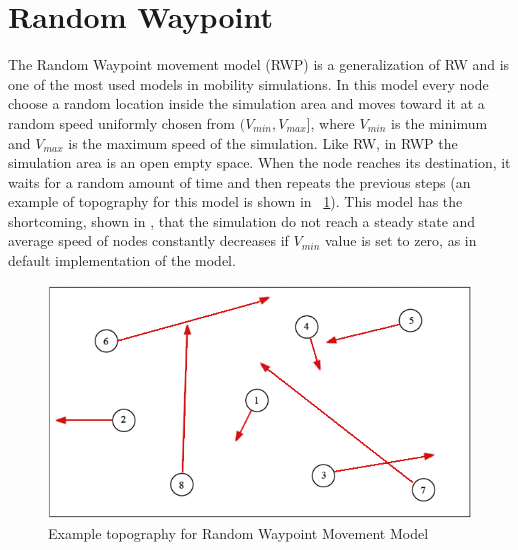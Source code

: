 \section{Random Waypoint}
The Random Waypoint movement model (RWP) is a generalization of RW and is one of the most used models in mobility simulations. In this model every node choose a random location inside the simulation area and moves toward it at a random speed uniformly chosen from $(V_{min}, V_{max}]$, where $V_{min}$ is the minimum and $V_{max}$ is the maximum speed of the simulation. Like RW, in RWP the simulation area is an open empty space. When the node reaches its destination, it waits for a random amount of time and then repeats the previous steps (an example of topography for this model is shown in \figurename~\ref{fig:random_waypoint}). This model has the shortcoming, shown in \cite{rwpharmful}, that the simulation do not reach a steady state and average speed of nodes constantly decreases if $V_{min}$ value is set to zero, as in default implementation of the model. 
\begin{figure}[htpb]
  \begin{center}
    \includegraphics[scale=0.6]{4-movimento/img/random_waypoint.png}
    \caption{Example topography for Random Waypoint Movement Model}    
    \label{fig:random_waypoint}
  \end{center}
\end{figure}

